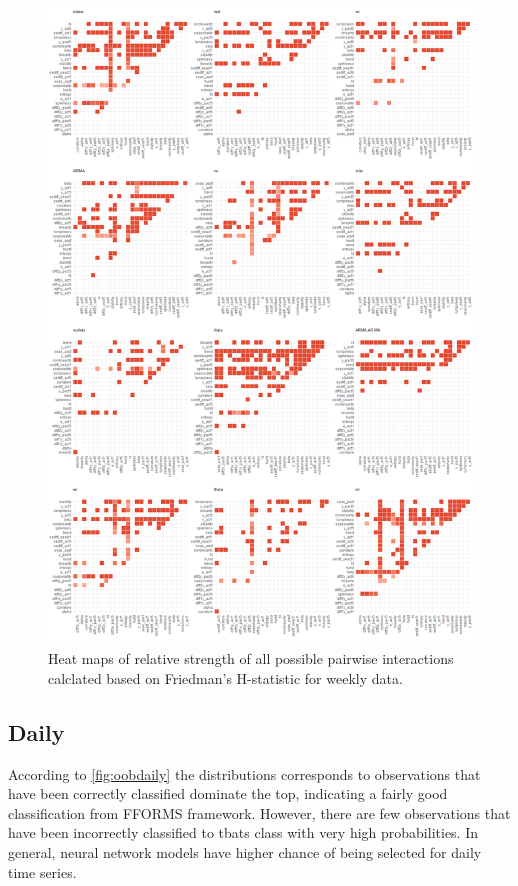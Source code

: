 \documentclass[11pt,a4paper,]{article}
\theoremstyle{definition}
\theoremstyle{definition}
\theoremstyle{definition}
\theoremstyle{remark}
\begin{document}
\newpage

\begin{figure}
\centering
\includegraphics{figures/friedmanHW-1.png}
\caption{\label{fig:friedmanHW}Heat maps of relative strength of all
possible pairwise interactions calclated based on Friedman's H-statistic
for weekly data.}
\end{figure}

\newpage

\subsection{Daily}\label{daily}

According to \autoref{fig:oobdaily} the distributions corresponds to
observations that have been correctly classified dominate the top,
indicating a fairly good classification from FFORMS framework. However,
there are few observations that have been incorrectly classified to
tbats class with very high probabilities. In general, neural network
models have higher chance of being selected for daily time series.
\end{document}
